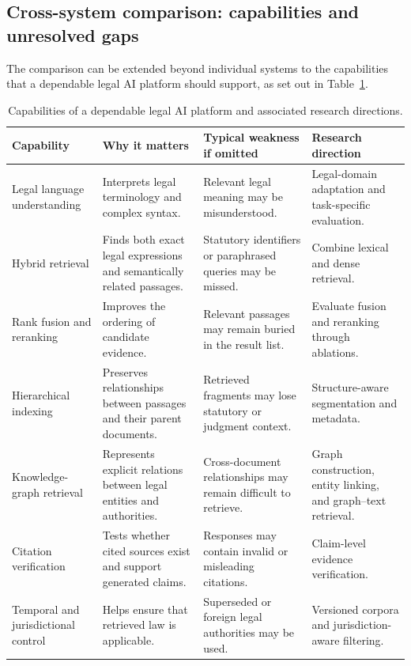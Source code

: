\subsection{Cross-system comparison: capabilities and unresolved gaps}

The comparison can be extended beyond individual systems to the capabilities that a dependable legal AI
platform should support, as set out in Table~\ref{tab:capabilities}.

\begin{table}[tp]
\centering
\caption{Capabilities of a dependable legal AI platform and associated research directions.}
\label{tab:capabilities}
\footnotesize
\setlength{\tabcolsep}{5pt}
\renewcommand{\arraystretch}{1.3}
\begin{tabularx}{\textwidth}{>{\raggedright\arraybackslash}p{3.0cm} >{\raggedright\arraybackslash}X >{\raggedright\arraybackslash}X >{\raggedright\arraybackslash}X}
\toprule
\textbf{Capability} & \textbf{Why it matters} & \textbf{Typical weakness if omitted} & \textbf{Research direction} \\
\midrule
Legal language understanding & Interprets legal terminology and complex syntax. & Relevant legal meaning may be misunderstood. & Legal-domain adaptation and task-specific evaluation. \\
Hybrid retrieval & Finds both exact legal expressions and semantically related passages. & Statutory identifiers or paraphrased queries may be missed. & Combine lexical and dense retrieval. \\
Rank fusion and reranking & Improves the ordering of candidate evidence. & Relevant passages may remain buried in the result list. & Evaluate fusion and reranking through ablations. \\
Hierarchical indexing & Preserves relationships between passages and their parent documents. & Retrieved fragments may lose statutory or judgment context. & Structure-aware segmentation and metadata. \\
Knowledge-graph retrieval & Represents explicit relations between legal entities and authorities. & Cross-document relationships may remain difficult to retrieve. & Graph construction, entity linking, and graph--text retrieval. \\
Citation verification & Tests whether cited sources exist and support generated claims. & Responses may contain invalid or misleading citations. & Claim-level evidence verification. \\
Temporal and jurisdictional control & Helps ensure that retrieved law is applicable. & Superseded or foreign legal authorities may be used. & Versioned corpora and jurisdiction-aware filtering. \\

\end{tabularx}
\end{table}
